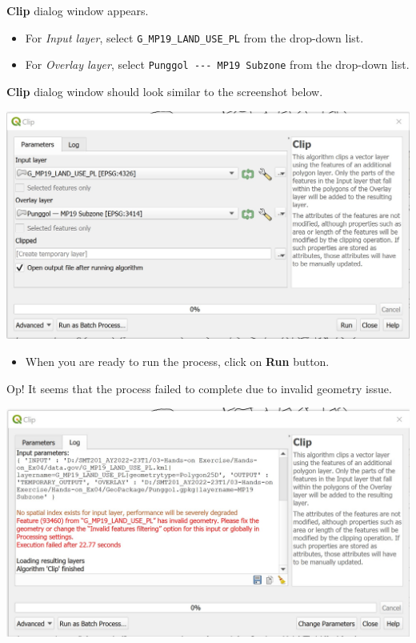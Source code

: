 \documentclass[
  letterpaper,
  DIV=11,
  numbers=noendperiod]{scrreprt}
\providecommand{\tightlist}{%
  \setlength{\itemsep}{0pt}\setlength{\parskip}{0pt}}\usepackage{longtable,booktabs,array}
\begin{document}
\textbf{Clip} dialog window appears.

\begin{itemize}
\item
  For \emph{Input layer}, select \texttt{G\_MP19\_LAND\_USE\_PL} from
  the drop-down list.
\item
  For \emph{Overlay layer}, select
  \texttt{Punggol\ -\/-\/-\ MP19\ Subzone} from the drop-down list.
\end{itemize}

\textbf{Clip} dialog window should look similar to the screenshot below.

\includegraphics{./img04/image23.jpg}

\begin{itemize}
\tightlist
\item
  When you are ready to run the process, click on \textbf{Run} button.
\end{itemize}

Op! It seems that the process failed to complete due to invalid geometry
issue.

\includegraphics{./img04/image24.jpg}
\end{document}

